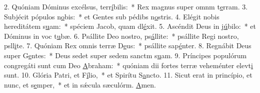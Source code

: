 2. Quóniam Dóminus excélsus, terr\uline{í}bilis:~* Rex magnus super omnm t\uline{e}rram.
3. Subjécit pópulos n\uline{o}bis:~* et Gentes sub pédibs n\uline{o}stris.
4. Elégit nobis hereditátem s\uline{u}am:~* spéciem Jacob, quam dl\uline{é}xit.
5. Ascéndit Deus in j\uline{ú}bilo:~* et Dóminus in voc t\uline{u}bæ.
6. Psállite Deo nostro, ps\uline{á}llite:~* psállite Regi nostro, psll\uline{i}te.
7. Quóniam Rex omnis terræ D\uline{e}us:~* psállite sap\uline{é}nter.
8. Regnábit Deus super G\uline{e}ntes:~* Deus sedet super sedem sanctm s\uline{u}am.
9. Príncipes populórum congregáti sunt cum Deo \uline{A}braham:~* quóniam dii fortes terræ veheménter elevt\uline{i} sunt.
10. Glória Patri, et F\uline{í}lio,~* et Spirítu S\uline{a}ncto.
11. Sicut erat in princípio, et nunc, et s\uline{e}mper,~* et in sǽcula sæculórm. \uline{A}men.
